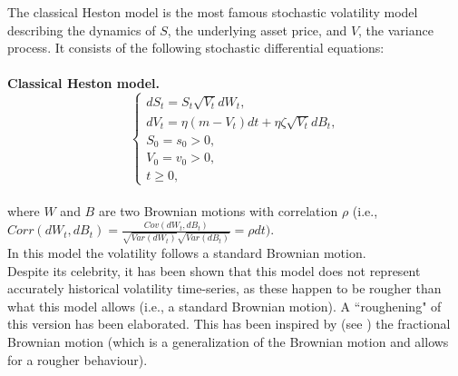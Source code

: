 \documentclass[a4paper,italian,11pt]{book}
\theoremstyle{plain}
\theoremstyle{remark}
\theoremstyle{plain}
\begin{document}
The classical Heston model is the most famous stochastic volatility model describing the dynamics of $S$, the underlying asset price, and $V$, the variance process. It consists of the following stochastic differential equations:
\\
\\
\textbf{Classical Heston model.}
\begin{equation}
    \label{eq: classicalHeston}
    \begin{cases}
    dS_t = S_t \sqrt{V_t} dW_t, \\
    dV_t = \eta (m - V_t) dt +  \eta \zeta \sqrt{V_t} dB_t, \\
    S_0 = s_0 >0, \\
    V_0 = v_0 >0, \\            
    t \ge 0,
    \end{cases}
\end{equation}
\\
where $W$ and $B$ are two Brownian motions with correlation $\rho$ (i.e., \\
$Corr(dW_t,dB_t) = \frac{Cov(dW_t, dB_t)}{\sqrt{Var(dW_t)} \sqrt{ Var(dB_t)}} = \rho dt)$. 
\\
In this model the volatility follows a standard Brownian motion.
\\

Despite its celebrity, it has been shown that this model does not represent accurately historical volatility time-series, as these happen to be rougher than what this model allows
(i.e., a standard Brownian motion). 
A ``roughening" of this version has been elaborated. This has been inspired by (see \cite{rosenbaum1}) the fractional Brownian motion (which is a generalization of the Brownian motion and allows for a rougher behaviour).
\\
\end{document}
